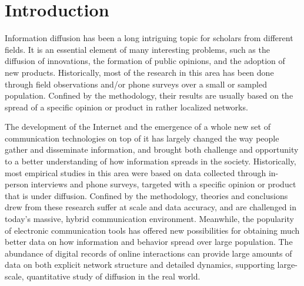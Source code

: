 \documentclass[phd,tocprelim]{cornell}
\begin{document}
\chapter{Introduction}


Information diffusion has been a long intriguing topic for scholars from different fields. It is an essential element of many interesting problems, such as the diffusion of innovations\cite{rogers-2003}, the formation of public opinions\cite{katz_lazarsfeld,Watts-2007}, and the adoption of new products\cite{Bass:1969}. Historically, most of the research in this area has been done through field observations and/or phone surveys\cite{katz_57,rogers-2003} over a small or sampled population. Confined by the methodology, their results are usually based on the spread of a specific opinion or product in rather localized networks. 

The development of the Internet and the emergence of a whole new set of communication technologies on top of it has largely changed the way people  gather and disseminate information, and brought both challenge and opportunity to a better understanding of how information spreads in the society.
Historically, most empirical studies in this area were based on data collected through in-person interviews and phone surveys\cite{rogers-2003,katz_lazarsfeld}, targeted with a specific opinion or product that is under diffusion. Confined by the methodology, theories and conclusions drew from these research suffer at scale and data accuracy, and are challenged in today's massive, hybrid communication environment. Meanwhile, the popularity of electronic communication tools has offered new possibilities for obtaining much better data on how information and behavior spread over large population. The abundance of digital records of online interactions can provide large amounts of data on both explicit network structure and detailed dynamics, supporting large-scale, quantitative study of diffusion in the real world.
\end{document}

